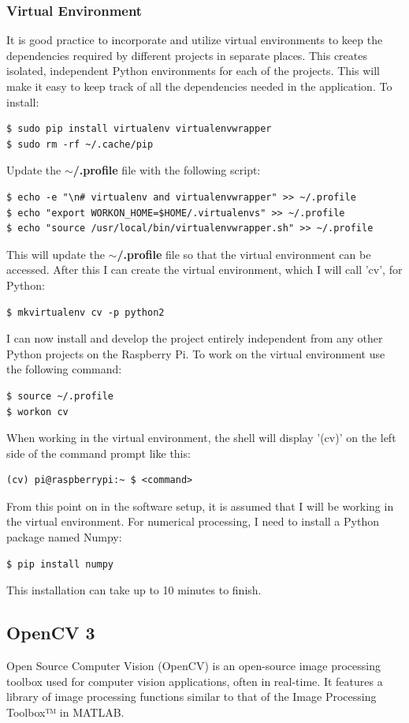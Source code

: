 \subsubsection{Virtual Environment}
It is good practice to incorporate and utilize virtual environments to keep the dependencies required by different projects in separate places. This creates isolated, independent Python environments for each of the projects. This will make it easy to keep track of all the dependencies needed in the application. To install:
\begin{verbatim}
$ sudo pip install virtualenv virtualenvwrapper
$ sudo rm -rf ~/.cache/pip
\end{verbatim}
Update the \textbf{$\sim$/.profile} file with the following script:
\begin{verbatim}
$ echo -e "\n# virtualenv and virtualenvwrapper" >> ~/.profile
$ echo "export WORKON_HOME=$HOME/.virtualenvs" >> ~/.profile
$ echo "source /usr/local/bin/virtualenvwrapper.sh" >> ~/.profile
\end{verbatim}
This will update the \textbf{$\sim$/.profile} file so that the virtual environment can be accessed. After this I can create the virtual environment, which I will call 'cv', for Python:
\begin{verbatim}
$ mkvirtualenv cv -p python2
\end{verbatim}
I can now install and develop the project entirely independent from any other Python projects on the Raspberry Pi. To work on the virtual environment use the following command:
\begin{verbatim}
$ source ~/.profile
$ workon cv
\end{verbatim}
When working in the virtual environment, the shell will display '(cv)' on the left side of the command prompt like this:
\begin{verbatim}
(cv) pi@raspberrypi:~ $ <command>
\end{verbatim}
From this point on in the software setup, it is assumed that I will be working in the virtual environment. For numerical processing, I need to install a Python package named Numpy:
\begin{verbatim}
$ pip install numpy
\end{verbatim}
This installation can take up to 10 minutes to finish.

\subsection{OpenCV 3}
Open Source Computer Vision (OpenCV) is an open-source image processing toolbox used for computer vision applications, often in real-time\cite{opencv}. It features a library of image processing functions similar to that of the Image Processing Toolbox™ in MATLAB. 

